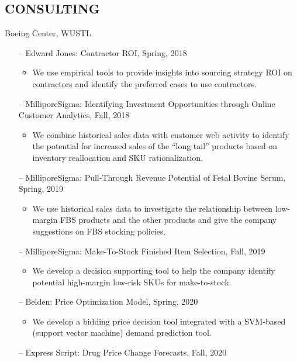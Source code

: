 \documentclass[margin, 10pt]{res} %
\begin{document}
\begin{resume}
\section{CONSULTING}
Boeing Center, WUSTL
\begin{itemize}
    \item[--]Edward Jones: Contractor ROI, Spring, 2018
        \begin{itemize}
            \item We use empirical tools to provide insights into sourcing strategy ROI on contractors and identify the preferred cases to use contractors.
        \end{itemize}	
    \item[--]MilliporeSigma: Identifying Investment Opportunities through Online Customer Analytics, Fall, 2018
        \begin{itemize}
            \item We combine historical sales data with customer web activity to identify the potential for increased sales of the “long tail” products based on inventory reallocation and SKU rationalization.   
        \end{itemize}
    \item[--]MilliporeSigma: Pull-Through Revenue Potential of Fetal Bovine Serum, Spring, 2019
        \begin{itemize}
            \item We use historical sales data to investigate the relationship between low-margin FBS products and the other products and give the company suggestions on FBS stocking policies.   
        \end{itemize}
    \item[--]MilliporeSigma: Make-To-Stock Finished Item Selection, Fall, 2019
        \begin{itemize}
            \item We develop a decision supporting tool to help the company identify potential high-margin low-risk SKUs for make-to-stock.
        \end{itemize}
    \item[--]Belden: Price Optimization Model, Spring, 2020
        \begin{itemize}
            \item We develop a bidding price decision tool integrated with a SVM-based (support vector machine) demand prediction tool.
        \end{itemize}
    \item[--]Express Script: Drug Price Change Forecasts, Fall, 2020

\end{itemize}
\end{resume}
\end{document}
